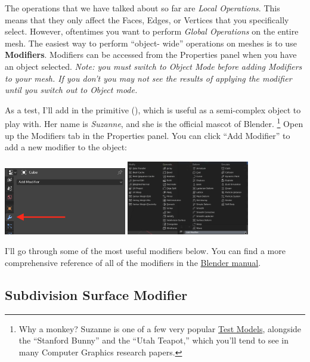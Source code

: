 \documentclass[11pt]{article}
\begin{document}
The operations that we have talked about so far are \textit{Local Operations}.  This means that they
only affect the Faces, Edges, or Vertices that you specifically select.  However, oftentimes you
want to perform \textit{Global Operations} on the entire mesh.  The easiest way to perform ``object-
wide'' operations on meshes is to use \textbf{Modifiers}.  Modifiers can be accessed from the
Properties panel when you have an object selected.  \textit{Note: you must switch to Object Mode
before adding Modifiers to your mesh.  If you don't you may not see the results of applying the
modifier until you switch out to Object mode.}

As a test, I'll add in the  primitive (), which is useful as a
semi-complex object to play with.  Her name is \textit{Suzanne}, and she is
the official mascot of Blender.  \footnote{Why a monkey?  Suzanne is one of a few very popular 
\href{https://en.wikipedia.org/wiki/List_of_common_3D_test_models}{Test Models}, alongside the
``Stanford Bunny'' and the ``Utah Teapot,'' which you'll tend to see in many Computer Graphics
research papers.}  Open up the Modifiers tab in the Properties panel.  You can click ``Add 
Modifier'' to add a new modifier to the object:
\begin{center}
    \includegraphics[width=0.4\textwidth]{modifier-panel-1} \includegraphics[width=0.4\textwidth]{modifier-panel-2}
\end{center}
I'll go through some of the most useful modifiers below.  You can find a more comprehensive 
reference of all of the modifiers in the 
\href{https://docs.blender.org/manual/en/latest/modeling/modifiers/index.html}{Blender manual}.

\subsection{Subdivision Surface Modifier}
\end{document}

